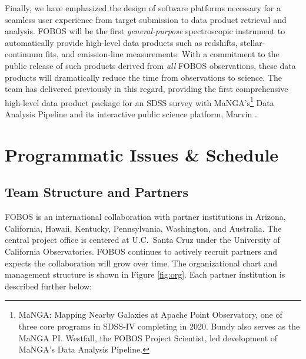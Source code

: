 \documentclass[oneside,11pt]{amsart}
\begin{document}
Finally, we have emphasized the design of software platforms
necessary for a seamless user experience from target submission to
data product retrieval and analysis. FOBOS will be the first
\emph{general-purpose} spectroscopic instrument to automatically
provide high-level data products such as redshifts, stellar-continuum
fits, and emission-line measurements. With a commitment to the public
release of such products derived from \emph{all} FOBOS observations,
these data products will dramatically reduce the time from
observations to science. The team has delivered previously in this
regard, providing the first comprehensive high-level data product
package for an SDSS survey with MaNGA's\footnote{MaNGA: Mapping
Nearby Galaxies at Apache Point Observatory, one of three core
programs in SDSS-IV completing in 2020. Bundy also serves as the
MaNGA PI. Westfall, the FOBOS Project Scientist, led development of
MaNGA's Data Analysis Pipeline.} Data Analysis Pipeline
\citep{westfall19} and its interactive public science platform,
Marvin \citep{cherinka19}.



\section{Programmatic Issues \& Schedule}


\subsection{Team Structure and Partners}

FOBOS is an international collaboration with partner institutions in
Arizona, California, Hawaii, Kentucky, Pennsylvania, Washington, and
Australia. The central project office is centered at U.C.\ Santa Cruz
under the University of California Observatories. FOBOS continues to
actively recruit partners and expects the collaboration will grow
over time. The organizational chart and management structure is shown
in Figure \ref{fig:org}. Each partner institution is described
further below:
\end{document}
